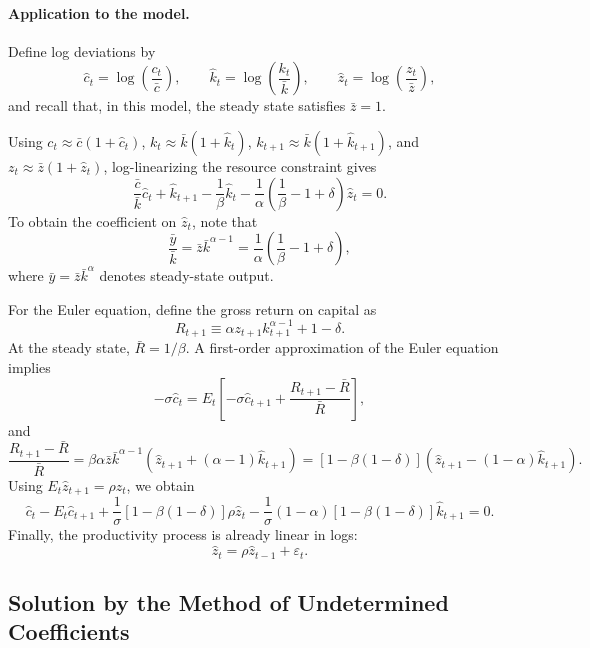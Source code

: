 \documentclass[12pt]{article}
\begin{document}
\paragraph{Application to the model.}
Define log deviations by
\[
\hat c_t = \log\left(\frac{c_t}{\bar c}\right),
\qquad
\hat k_t = \log\left(\frac{k_t}{\bar k}\right),
\qquad
\hat z_t = \log\left(\frac{z_t}{\bar z}\right),
\]
and recall that, in this model, the steady state satisfies $\bar z=1$.

Using $c_t \approx \bar c(1+\hat c_t)$, $k_t \approx \bar k(1+\hat k_t)$, $k_{t+1}\approx \bar k(1+\hat k_{t+1})$, and $z_t \approx \bar z(1+\hat z_t)$, log-linearizing the resource constraint gives
\begin{equation}
\frac{\bar c}{\bar k}\hat c_t + \hat k_{t+1}
- \frac{1}{\beta}\hat k_t
- \frac{1}{\alpha}\left(\frac{1}{\beta}-1+\delta\right)\hat z_t
= 0.
\label{eq:lin_resource}
\end{equation}
To obtain the coefficient on $\hat z_t$, note that
\[
\frac{\bar y}{\bar k} = \bar z \bar k^{\alpha-1}
= \frac{1}{\alpha}\left(\frac{1}{\beta}-1+\delta\right),
\]
where $\bar y=\bar z\bar k^\alpha$ denotes steady-state output.

For the Euler equation, define the gross return on capital as
\[
R_{t+1} \equiv \alpha z_{t+1}k_{t+1}^{\alpha-1}+1-\delta.
\]
At the steady state, $\bar R = 1/\beta$. A first-order approximation of the Euler equation implies
\[
-\sigma \hat c_t = E_t\left[-\sigma \hat c_{t+1} + \frac{R_{t+1}-\bar R}{\bar R}\right],
\]
and
\[
\frac{R_{t+1}-\bar R}{\bar R}
=
\beta \alpha \bar z \bar k^{\alpha-1}
\left(\hat z_{t+1}+(\alpha-1)\hat k_{t+1}\right)
=
\left[1-\beta(1-\delta)\right]
\left(\hat z_{t+1}-(1-\alpha)\hat k_{t+1}\right).
\]
Using $E_t \hat z_{t+1}=\rho \hat z_t$, we obtain
\begin{equation}
\hat c_t - E_t\hat c_{t+1}
+ \frac{1}{\sigma}\left[1-\beta(1-\delta)\right]\rho \hat z_t
- \frac{1}{\sigma}(1-\alpha)\left[1-\beta(1-\delta)\right]\hat k_{t+1}
= 0.
\label{eq:lin_euler}
\end{equation}
Finally, the productivity process is already linear in logs:
\begin{equation}
\hat z_t = \rho \hat z_{t-1} + \varepsilon_t.
\label{eq:lin_ar1}
\end{equation}

\subsection{Solution by the Method of Undetermined Coefficients}
\end{document}
